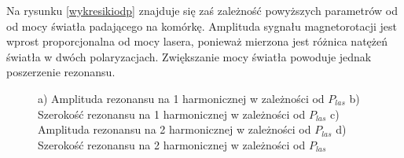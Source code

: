 \documentclass[a4paper,10pt]{article}
\begin{document}
Na rysunku \ref{wykresikiodp} znajduje się zaś zależność powyższych parametrów od od mocy światła padającego na komórkę. Amplituda sygnału magnetorotacji jest wprost proporcjonalna od mocy lasera, ponieważ mierzona jest różnica natężeń światła w dwóch polaryzacjach. Zwiększanie mocy światła powoduje jednak poszerzenie rezonansu.


\begin{figure}[h!]
\centering
{}

\caption{ a) Amplituda rezonansu na 1 harmonicznej w zależności od $P_{las}$ b) Szerokość rezonansu na 1 harmonicznej w zależności od $P_{las}$ 
c) Amplituda rezonansu na 2 harmonicznej w zależności od $P_{las}$ d) Szerokość rezonansu na 2 harmonicznej w zależności od $P_{las}$}
\label{wykresikiodP}
\end{figure}
\end{document}
